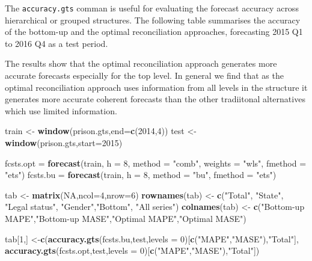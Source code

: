 \documentclass[]{book}
\newenvironment{Shaded}{\begin{snugshade}}{\end{snugshade}}
\newcommand{\DataTypeTok}[1]{\textcolor[rgb]{0.13,0.29,0.53}{#1}}
\newcommand{\DecValTok}[1]{\textcolor[rgb]{0.00,0.00,0.81}{#1}}
\newcommand{\KeywordTok}[1]{\textcolor[rgb]{0.13,0.29,0.53}{\textbf{#1}}}
\newcommand{\NormalTok}[1]{#1}
\newcommand{\OtherTok}[1]{\textcolor[rgb]{0.56,0.35,0.01}{#1}}
\newcommand{\StringTok}[1]{\textcolor[rgb]{0.31,0.60,0.02}{#1}}
\begin{document}
The \texttt{accuracy.gts} comman is useful for evaluating the forecast accuracy across hierarchical or grouped structures. The following table summarises the accuracy of the bottom-up and the optimal reconciliation approaches, forecasting 2015 Q1 to 2016 Q4 as a test period.

The results show that the optimal reconciliation approach generates more accurate forecasts especially for the top level. In general we find that as the optimal reconciliation approach uses information from all levels in the structure it generates more accurate coherent forecasts than the other tradiitonal alternatives which use limited information.

\begin{Shaded}
\begin{Highlighting}[]
\NormalTok{train <-}\StringTok{ }\KeywordTok{window}\NormalTok{(prison.gts,}\DataTypeTok{end=}\KeywordTok{c}\NormalTok{(}\DecValTok{2014}\NormalTok{,}\DecValTok{4}\NormalTok{))}
\NormalTok{test <-}\StringTok{ }\KeywordTok{window}\NormalTok{(prison.gts,}\DataTypeTok{start=}\DecValTok{2015}\NormalTok{)}

\NormalTok{fcsts.opt =}\StringTok{ }\KeywordTok{forecast}\NormalTok{(train, }\DataTypeTok{h =} \DecValTok{8}\NormalTok{, }\DataTypeTok{method =} \StringTok{"comb"}\NormalTok{, }\DataTypeTok{weights =} \StringTok{"wls"}\NormalTok{, }\DataTypeTok{fmethod =} \StringTok{"ets"}\NormalTok{)}
\NormalTok{fcsts.bu =}\StringTok{ }\KeywordTok{forecast}\NormalTok{(train, }\DataTypeTok{h =} \DecValTok{8}\NormalTok{, }\DataTypeTok{method =} \StringTok{"bu"}\NormalTok{, }\DataTypeTok{fmethod =} \StringTok{"ets"}\NormalTok{)}

\NormalTok{tab <-}\StringTok{ }\KeywordTok{matrix}\NormalTok{(}\OtherTok{NA}\NormalTok{,}\DataTypeTok{ncol=}\DecValTok{4}\NormalTok{,}\DataTypeTok{nrow=}\DecValTok{6}\NormalTok{)}
\KeywordTok{rownames}\NormalTok{(tab) <-}\StringTok{ }\KeywordTok{c}\NormalTok{(}\StringTok{"Total"}\NormalTok{, }\StringTok{"State"}\NormalTok{, }\StringTok{"Legal status"}\NormalTok{, }\StringTok{"Gender"}\NormalTok{,}\StringTok{"Bottom"}\NormalTok{, }\StringTok{"All series"}\NormalTok{)}
\KeywordTok{colnames}\NormalTok{(tab) <-}\StringTok{ }\KeywordTok{c}\NormalTok{(}\StringTok{"Bottom-up MAPE"}\NormalTok{,}\StringTok{"Bottom-up MASE"}\NormalTok{,}\StringTok{"Optimal MAPE"}\NormalTok{,}\StringTok{"Optimal MASE"}\NormalTok{)}

\NormalTok{tab[}\DecValTok{1}\NormalTok{,] <-}\KeywordTok{c}\NormalTok{(}\KeywordTok{accuracy.gts}\NormalTok{(fcsts.bu,test,}\DataTypeTok{levels =} \DecValTok{0}\NormalTok{)[}\KeywordTok{c}\NormalTok{(}\StringTok{"MAPE"}\NormalTok{,}\StringTok{"MASE"}\NormalTok{),}\StringTok{"Total"}\NormalTok{],}
            \KeywordTok{accuracy.gts}\NormalTok{(fcsts.opt,test,}\DataTypeTok{levels =} \DecValTok{0}\NormalTok{)[}\KeywordTok{c}\NormalTok{(}\StringTok{"MAPE"}\NormalTok{,}\StringTok{"MASE"}\NormalTok{),}\StringTok{"Total"}\NormalTok{])}


\end{Highlighting}
\end{Shaded}
\end{document}
